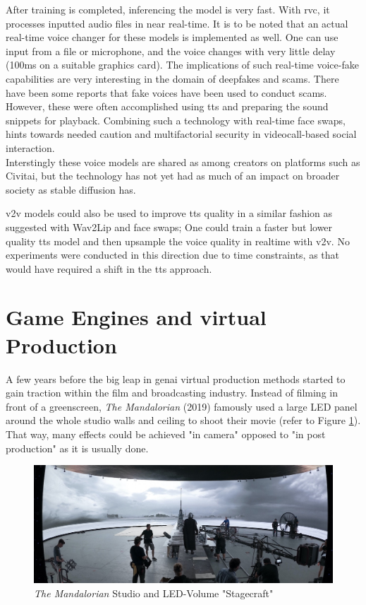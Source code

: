 \documentclass[
  a4paper,  %
  twoside,  %
  bibliography=totoc,
  headsepline,
  cleardoublepage=empty,
  parskip=half,
  draft=false
]{scrbook}
\begin{document}
After training is completed, inferencing the model is very fast. With \gls{rvc}, it processes inputted audio files in near real-time. It is to be noted that an actual real-time voice changer for these models is implemented as well\cite{WokadaVoicechangerVoice}. One can use input from a file or microphone, and the voice changes with very little delay (100ms on a suitable graphics card). The implications of such real-time voice-fake capabilities are very interesting in the domain of deepfakes and scams. There have been some reports that fake voices have been used to conduct scams. However, these were often accomplished using \gls{tts} and preparing the sound snippets for playback. Combining such a technology with real-time face swaps, hints towards needed caution and multifactorial security in videocall-based social interaction. \\
Interstingly these voice models are shared as among creators on platforms such as Civitai, but the technology has not yet had as much of an impact on broader society as stable diffusion has.

\gls{v2v} models could also be used to improve \gls{tts} quality in a similar fashion as suggested with Wav2Lip and face swaps; One could train a faster but lower quality \gls{tts} model and then upsample the voice quality in realtime with \gls{v2v}. No experiments were conducted in this direction due to time constraints, as that would have required a shift in the \gls{tts} approach.

\section{Game Engines and virtual Production}
\label{sec:bg-virtual-production}
A few years before the big leap in \gls{genai} virtual production methods started to gain traction within the film and broadcasting industry. Instead of filming in front of a greenscreen, \textit{The Mandalorian} (2019) famously used a large LED panel around the whole studio walls and ceiling to shoot their movie (refer to Figure \ref{fig:mando-vps}). That way, many effects could be achieved "in camera" opposed to "in post production" as it is usually done.

\begin{figure}[h]
  \centering
  \includegraphics[width=1\textwidth]{./graphics/mandalorian-vp.jpg}
  \caption{\textit{The Mandalorian} Studio and LED-Volume "Stagecraft" \cite{landsiedelGamechanger2021}}
  \label{fig:mando-vps}
\end{figure}
\end{document}
